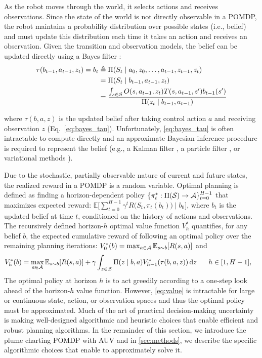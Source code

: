 As the robot moves through the world, it selects actions and receives observations. Since the state of the world is not directly observable in a POMDP, the robot maintains a probability distribution over possible states (i.e., belief) and must update this distribution each time it takes an action and receives an observation. Given the transition and observation models, the belief can be updated directly using a Bayes filter \autocite{sarkka2013bayesian}:
\begin{align}
    \tau(b_{t-1}, a_{t-1}, z_t) = b_t
        &\triangleq \Pi(S_t \mid a_0, z_0, \dots, a_{t-1}, z_{t-1}, z_t) \\
        &= \Pi(S_t \mid b_{t-1}, a_{t-1}, z_t) \\
        &= \frac{\int_{s \in \mathcal{S}} O(s, a_{t-1}, z_t) T(s, a_{t-1}, s')b_{t-1}(s')}{\Pi(z_t \mid b_{t-1}, a_{t-1})}
    \label{eq:bayes_tau}
\end{align}

where $\tau(b,a,z)$ is the updated belief after taking control action $a$ and receiving observation $z$ (Eq.~\ref{eq:bayes_tau}). Unfortunately, \cref{eq:bayes_tau} is often intractable to compute directly and an approximate Bayesian inference procedure is required to represent the belief (e.g., a Kalman filter \autocite{welch1995introduction}, a particle filter \autocite{Silver2010}, or variational methods \autocite{wainwright2002environmental,kucukelbir2017automatic}). 

Due to the stochastic, partially observable nature of current and future states, the realized reward in a POMDP is a random variable. Optimal planning is defined as finding a horizon-dependent policy $\{\pi_t^*: \Pi(\mathcal{S}) \to \mathcal{A}\}_{t=0}^{H-1}$ that maximizes expected reward: $\mathbb{E} \Big[ \sum_{t=0}^{H-1} \gamma^t R\big(S_t, \pi_t(b_t)\big) \mid b_0 \Big]$, where $b_t$ is the updated belief at time $t$, conditioned on the history of actions and observations. The recursively defined horizon-$h$ optimal value function $V^*_h$ quantifies, for any belief $b$, the expected cumulative reward of following an optimal policy over the remaining planning iterations: $V_0^{*}(b) = \operatorname*{max}_{a \in \mathcal{A}} \mathbb{E}_{s \sim b}[R(s, a)]$ and
\begin{align}
     V_h^{*}(b) &=  \max_{a \in \mathcal{A}} \mathbb{E}_{s \sim b}[R(s, a)] + \gamma \int_{z \in \mathcal{Z}} \Pi(z \mid b, a) V_{h-1}^*(\tau(b, a,z)) \, \text{d}z \hspace{0.6cm} h \in [1, H-1],
    \label{eq:value}
\end{align}
The optimal policy at horizon $h$ is to act greedily according to a one-step look ahead of the horizon-$h$ value function. However, \cref{eq:value} is  intractable for large or continuous state, action, or observation spaces and thus the optimal policy must be approximated. Much of the art of practical decision-making uncertainty is making well-designed algorithmic and heuristic choices that enable efficient and robust planning algorithms. In the remainder of this section, we introduce the plume charting POMDP with AUV \Sentry and in \cref{sec:methods}, we describe the specific algorithmic choices that enable \PHORTEX to approximately solve it.  


